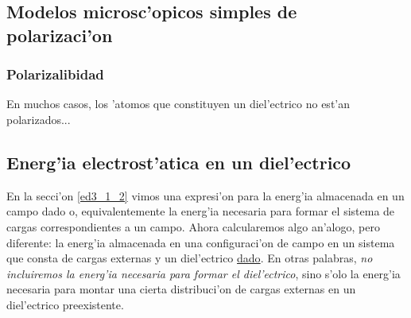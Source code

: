\subsection{Modelos microsc'opicos simples de polarizaci'on}
\subsubsection{Polarizalibidad}
En muchos casos, los 'atomos que constituyen un diel'ectrico no est'an polarizados...

\subsection{Energ'ia electrost'atica en un diel'ectrico}

En la secci'on \ref{ed3_1_2} vimos una expresi'on para la energ'ia almacenada
en un campo dado o, equivalentemente la energ'ia necesaria para formar el
sistema de cargas correspondientes a un campo. Ahora calcularemos algo
an'alogo, pero diferente: la energ'ia almacenada en una configuraci'on de campo
en un sistema que consta de cargas externas y un diel'ectrico \underline{dado}.
En otras palabras, \textit{no incluiremos la energ'ia necesaria para formar el
diel'ectrico}, sino s'olo la energ'ia necesaria para montar una cierta
distribuci'on de cargas externas en un diel'ectrico preexistente.

